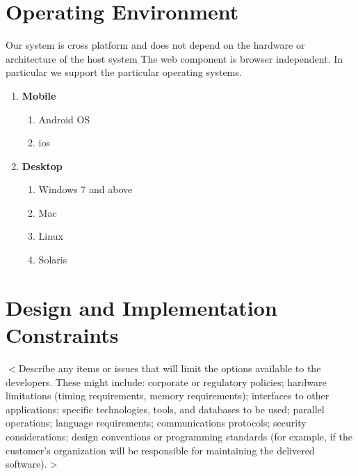 \documentclass{scrreprt}
\begin{document}
\begin{comment}
$<$Identify the various user classes that you anticipate will use this product.  
User classes may be differentiated based on frequency of use, subset of product 
functions used, technical expertise, security or privilege levels, educational 
level, or experience. Describe the pertinent characteristics of each user class.  
Certain requirements may pertain only to certain user classes. Distinguish the 
most important user classes for this product from those who are less important 
to satisfy.$>$
\end{comment}
\section{Operating Environment}
  Our system is cross platform and does not depend on the hardware or architecture of the host system The web component is browser independent. In particular we support the particular operating systems.
  \begin{enumerate}
  \item \textbf{Mobile}\\
  \begin{enumerate}
  \item Android OS
  \item ios
  \end{enumerate}
  \item \textbf{Desktop}\\
  \begin{enumerate}
     \item Windows 7 and above
     \item Mac
     \item Linux
     \item Solaris
  \end{enumerate}
  \end{enumerate}
\begin{comment}
$<$Describe the environment in which the software will operate, including the 
hardware platform, operating system and versions, and any other software 
components or applications with which it must peacefully coexist.$>$
\end{comment}
\section{Design and Implementation Constraints}
$<$Describe any items or issues that will limit the options available to the 
developers. These might include: corporate or regulatory policies; hardware 
limitations (timing requirements, memory requirements); interfaces to other 
applications; specific technologies, tools, and databases to be used; parallel 
operations; language requirements; communications protocols; security 
considerations; design conventions or programming standards (for example, if the 
customer’s organization will be responsible for maintaining the delivered 
software).$>$
\end{document}
